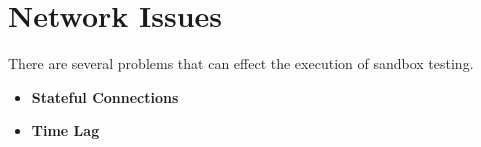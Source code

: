 \section{Network Issues}
\label{sec:network_issues}

There are several problems that can effect the execution of sandbox testing. 

\begin{itemize}
  \item \textbf{Stateful Connections}
  \item \textbf{Time Lag}
\end{itemize}
